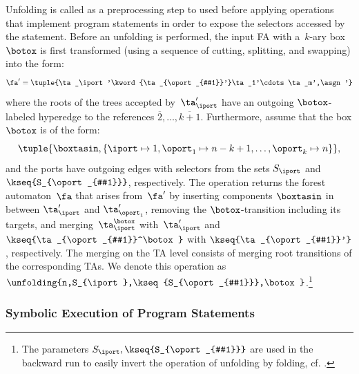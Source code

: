 Unfolding is called as a preprocessing step to used before applying operations that implement
program statements
in order to expose the selectors accessed by the statement. 
Before an unfolding is performed, the input FA with a~$k$-ary box~$\botox$ is first transformed
(using a sequence of cutting, splitting, and swapping)
into the form:
$$\fa' = \tuple{\ta_\iport'\kword{\ta_{\oport_{#1}}'}\ta_1'\cdots\ta_m',\asgn'}$$
where
the roots of the trees accepted by~$\ta'_\iport$ have an outgoing
$\botox$-labeled hyperedge to the references
$\overline {2},\ldots,{\overline{k+1}}$.
%
Furthermore, assume that the box $\botox$ is of the form:
\begin{equation*} 
\tuple{\boxtasin,\{\iport\mapsto 1,\oport_1 \mapsto n-k+1, \ldots, \oport_k \mapsto n\}},
\end{equation*} 
%
and 
%
the ports have outgoing edges with selectors from the sets 
$S_\iport$ and $\kseq{S_{\oport_{#1}}}$, respectively. 
%
The operation returns the forest automaton~$\fa$ that arises from~$\fa'$ by 
%
inserting components $\boxtasin$ in between $\ta'_\iport$ and
$\ta'_{\oport_{1}}$, 
removing the $\botox$-transition
including its targets, 
and merging~$\ta_\iport^\botox$ with~$\ta_\iport'$ and $\kseq{\ta_{\oport_{#1}}^\botox}$
with $\kseq{\ta_{\oport_{#1}}'}$, respectively.
The merging on the TA level consists of merging root transitions of the
corresponding TAs.
%
We denote this operation as $\unfolding{n,S_{\iport},\kseq{S_{\oport_{#1}}},\botox}$.\footnote{The parameters $S_{\iport},\kseq{S_{\oport_{#1}}}$ are used  in the backward run to easily invert the operation of unfolding by folding, cf. .}

\subsubsection*{Symbolic Execution of Program Statements}\label{sec:label}

